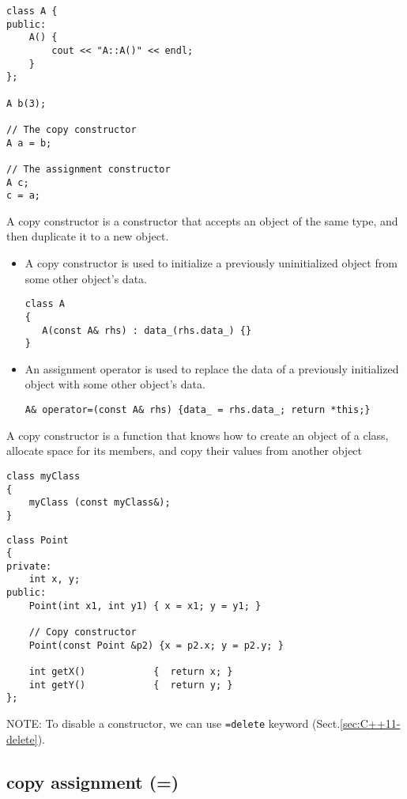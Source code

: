 \begin{lstlisting}
class A {
public:
    A() {
        cout << "A::A()" << endl;
    }
};

A b(3);

// The copy constructor
A a = b;

// The assignment constructor
A c;
c = a;
\end{lstlisting}
A copy constructor is a constructor that accepts an object of the same type, and
then duplicate it to a new object.
\begin{itemize}
  \item  A copy constructor is used to initialize a previously uninitialized object from some other object's data.
  
\begin{lstlisting}
class A
{
   A(const A& rhs) : data_(rhs.data_) {}
}
\end{lstlisting}

  \item An assignment operator is used to replace the data of a previously initialized object with some other object's data.
\begin{lstlisting}
A& operator=(const A& rhs) {data_ = rhs.data_; return *this;}
\end{lstlisting}

\end{itemize}

A copy constructor is a function that knows how to create an object of a class,
allocate space for its members, and copy their values from another object

\begin{verbatim}
class myClass
{
	myClass (const myClass&);
}
\end{verbatim}

\begin{verbatim}
class Point 
{ 
private: 
    int x, y; 
public: 
    Point(int x1, int y1) { x = x1; y = y1; } 
  
    // Copy constructor 
    Point(const Point &p2) {x = p2.x; y = p2.y; } 
  
    int getX()            {  return x; } 
    int getY()            {  return y; } 
}; 
\end{verbatim}

NOTE: To disable a constructor, we can use \verb!=delete! keyword
(Sect.\ref{sec:C++11-delete}).


\subsection{copy assignment (=)}



